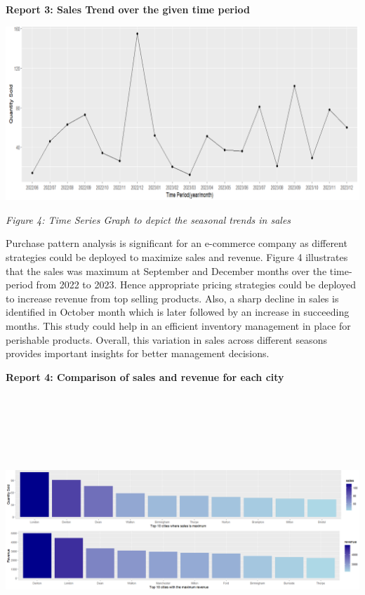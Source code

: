 \documentclass[
  letterpaper,
  DIV=11,
  numbers=noendperiod]{scrartcl}
\begin{document}
\textbf{Report 3: Sales Trend over the given time period}

\includegraphics{images/Time Series Graph.png}

\emph{Figure 4: Time Series Graph to depict the seasonal trends in
sales}

Purchase pattern analysis is significant for an e-commerce company as
different strategies could be deployed to maximize sales and revenue.
Figure 4 illustrates that the sales was maximum at September and
December months over the time-period from 2022 to 2023. Hence
appropriate pricing strategies could be deployed to increase revenue
from top selling products. Also, a sharp decline in sales is identified
in October month which is later followed by an increase in succeeding
months. This study could help in an efficient inventory management in
place for perishable products. Overall, this variation in sales across
different seasons provides important insights for better management
decisions.

\textbf{Report 4: Comparison of sales and revenue for each city}

\includegraphics[width=7.61458in,height=4.04167in]{images/Revenue Graph.png}
\end{document}
